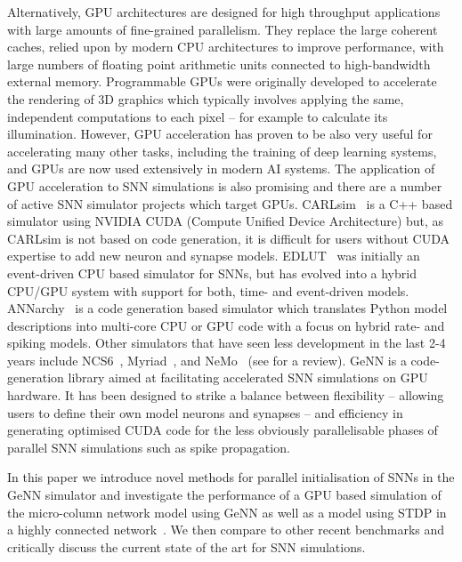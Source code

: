 \documentclass[utf8]{frontiersSCNS} %
\begin{document}
Alternatively, GPU architectures are designed for high throughput applications with large amounts of fine-grained parallelism.
They replace the large coherent caches, relied upon by modern CPU architectures to improve performance, with large numbers of floating point arithmetic units connected to high-bandwidth external memory. 
Programmable GPUs were originally developed to accelerate the rendering of 3D graphics which typically involves applying the same, independent computations to each pixel -- for example to calculate its illumination.
However, GPU acceleration has proven to be also very useful for accelerating many other tasks, including the training of deep learning systems, and GPUs are now used extensively in modern AI systems. 
The application of GPU acceleration to SNN simulations is also promising and there are a number of active SNN simulator projects which target GPUs. 
CARLsim~\citep{Chou2018} is a C++ based simulator using NVIDIA CUDA (Compute Unified Device Architecture) but, as CARLsim is not based on code generation, it is difficult for users without CUDA expertise to add new neuron and synapse models.
EDLUT~\citep{Garrido2011} was initially an event-driven CPU based simulator for SNNs, but has evolved into a hybrid CPU/GPU system with support for both, time- and event-driven models.
ANNarchy~\citep{Vitay2015} is a code generation based simulator which translates Python model descriptions into multi-core CPU or GPU code with a focus on hybrid rate- and spiking models.
Other simulators that have seen less development in the last 2-4 years include NCS6~\citep{Hoang2013}, Myriad~\citep{Rittner2016}, and NeMo~\citep{Fidjeland2009} (see \citet{Brette2012} for a review).
GeNN \citep{Yavuz2016} is a code-generation library aimed at facilitating accelerated SNN simulations on GPU hardware.
It has been designed to strike a balance between flexibility -- allowing users to define their own model neurons and synapses -- and efficiency in generating optimised CUDA code for the less obviously parallelisable phases of parallel SNN simulations such as spike propagation.

In this paper we introduce novel methods for parallel initialisation of SNNs in the GeNN simulator and investigate the performance of a GPU based simulation of the micro-column network model \citep{Potjans2012} using GeNN as well as a model using STDP in a highly connected network~\citep{Morrison2007}.
We then compare to other recent benchmarks \citep{VanAlbada2018} and critically discuss the current state of the art for SNN simulations.
\end{document}
